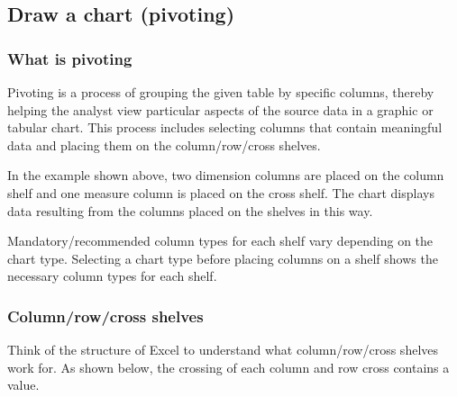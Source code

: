 \documentclass[letterpaper,10pt,english]{sphinxmanual}
\begin{document}
\subsection{Draw a chart (pivoting)}
\label{\detokenize{discovery/part04/pivoting:pivoting}}\label{\detokenize{discovery/part04/pivoting::doc}}

\subsubsection{What is pivoting}
\label{\detokenize{discovery/part04/pivoting:id1}}
Pivoting is a process of grouping the given table by specific columns, thereby helping the analyst view particular aspects of the source data in a graphic or tabular chart. This process includes selecting columns that contain meaningful data and placing them on the column/row/cross shelves.
\begin{quote}

\begin{figure}[H]
\centering

\noindent{}
\end{figure}
\end{quote}

In the example shown above, two dimension columns are placed on the column shelf and one measure column is placed on the cross shelf. The chart displays data resulting from the columns placed on the shelves in this way.

Mandatory/recommended column types for each shelf vary depending on the chart type. Selecting a chart type before placing columns on a shelf shows the necessary column types for each shelf.
\begin{quote}

\begin{figure}[H]
\centering

\noindent{}
\end{figure}
\end{quote}


\subsubsection{Column/row/cross shelves}
\label{\detokenize{discovery/part04/pivoting:id2}}
Think of the structure of Excel to understand what column/row/cross shelves work for. As shown below, the crossing of each column and row cross contains a value.
\begin{quote}

\begin{figure}[H]
\centering

\noindent{}
\end{figure}
\end{quote}
\end{document}
